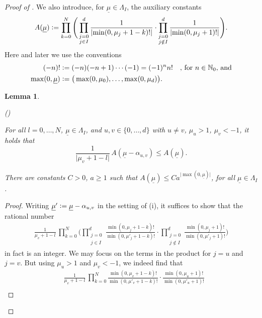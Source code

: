 \documentclass[a4paper, reqno, 10pt]{amsart}
\newtheorem{lemma}[theorem]{Lemma}
\theoremstyle{definition}
\newenvironment{altenumerate}
	{\begin{list}
		{\textup{(\theenumi)} }
		{\usecounter{enumi}
			\setlength{\labelwidth}{0pt}
			\setlength{\labelsep}{0pt}
			\setlength{\leftmargin}{0pt}
			\setlength{\itemsep}{0pt}
			\setlength{\topsep}{0pt}
		\renewcommand{\theenumi}{\roman{enumi}}
		}}
	{\end{list}}
\numberwithin{equation}{section}
\newcommand{\abs}[1]{{\lvert{#1}\rvert}}
\newcommand{\defeq}{\vcentcolon=}
\newcommand{\ul}[1]{{\underline{#1}}}
\newcommand{\BN}{{\mathbb {N}}}
\begin{document}
\begin{proof}[{Proof of }]
We also introduce, for $\ul{\mu} \in \Lambda_I$, the auxiliary constants
\begin{equation*}
	A(\ul{\mu}) \defeq \prod_{k=0}^N  \Bigg( \prod_{\substack{j=0 \\ j\in I}}^d \frac{1}{\abs{\min(0, \mu_j +1 -k)!}} \cdot \prod_{\substack{j=0 \\ j\notin I}}^d \frac{1}{\abs{\min(0, \mu_j +1)!}} \Bigg) .
\end{equation*}
Here and later we use the conventions
\begin{align*}
	(-n)! 				&\defeq (-n)(-n+1)\cdots(-1) = (-1)^n n! \quad\text{, for $n\in \BN_0$, and} \\
	\max(0,\ul{\mu})	&\defeq \big(\max(0,\mu_0),\ldots, \max(0,\mu_d) \big) .
\end{align*}


\begin{lemma}\label{Lemma 3 - Estimates for auxiliary function}
	\begin{altenumerate}
		\item
			For all $l = 0,\ldots,N$, $\ul{\mu} \in \Lambda_I$, and $u,v \in \{0,\ldots,d\}$ with $u \neq v$, $\mu_u >1$, $\mu_v <-1$, it holds that
			\begin{equation*}
				\frac{1}{\abs{\mu_v +1 - l}} \, A(\ul{\mu} - \alpha_{u,v}) \leq A(\ul{\mu}) .
			\end{equation*}
		\item
			There are constants $C>0$, $a\geq 1$ such that $A(\ul{\mu}) \leq C a^\abs{\max(0,\ul{\mu})}$, for all $\ul{\mu}\in \Lambda_I$.
	\end{altenumerate}
\end{lemma}
\begin{proof}
	Writing $\ul{\mu}' \defeq \ul{\mu}-\alpha_{u,v}$ in the setting of (i), it suffices to show that the rational number
	\begin{align*}
		\frac{1}{\mu_v +1 - l} \,\prod_{k=0}^N  \Bigg( \prod_{\substack{j=0 \\ j\in I}}^d \frac{\min(0, \mu_j +1 -k)!}{\min(0, \mu'_j +1 -k)!} \cdot \prod_{\substack{j=0 \\ j\notin I}}^d \frac{\min(0, \mu_j +1)!}{\min(0, \mu'_j +1)!} \Bigg)
	\end{align*}
	in fact is an integer.
	We may focus on the terms in the product for $j=u$ and $j=v$.
	But using $\mu_u >1$ and $\mu_v <-1$, we indeed find that
	\begin{align*}
		&\frac{1}{\mu_v +1 - l} \,\prod_{k=0}^N   \frac{\min(0, \mu_v +1 -k)!}{\min(0, \mu'_v +1 -k)!} \cdot \frac{\min(0, \mu_u +1)!}{\min(0, \mu'_u +1)!} \\

\end{align*}
\end{proof}
\end{proof}
\end{document}
